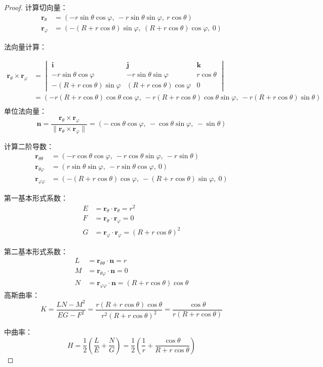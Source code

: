 \documentclass[lang=cn,10pt,thmcnt=section]{elegantbook}
\begin{document}
\begin{proof}
    计算切向量：
\begin{align*}
\bm{r}_\theta &= (-r \sin\theta \cos\varphi,\ -r \sin\theta \sin\varphi,\ r \cos\theta) \\
\bm{r}_\varphi &= (-(R + r \cos\theta) \sin\varphi,\ (R + r \cos\theta) \cos\varphi,\ 0)
\end{align*}

法向量计算：

\begin{align*}
    \bm{r}_\theta \times \bm{r}_\varphi &= \begin{vmatrix}
        \bm{i} & \bm{j} & \bm{k} \\
        -r \sin\theta \cos\varphi & -r \sin\theta \sin\varphi & r \cos\theta \\
        -(R + r \cos\theta)\sin\varphi & (R + r \cos\theta)\cos\varphi & 0
        \end{vmatrix}\\
        &= (-r(R + r \cos\theta)\cos\theta\cos\varphi,\ -r(R + r \cos\theta)\cos\theta\sin\varphi,\ -r(R + r \cos\theta)\sin\theta) \\
\end{align*}
单位法向量：
\[
\bm{n} = \frac{\bm{r}_\theta \times \bm{r}_\varphi}{\|\bm{r}_\theta \times \bm{r}_\varphi\|} = (-\cos\theta\cos\varphi,\ -\cos\theta\sin\varphi,\ -\sin\theta)
\]

计算二阶导数：
\begin{align*}
\bm{r}_{\theta\theta} &= (-r \cos\theta \cos\varphi,\ -r \cos\theta \sin\varphi,\ -r \sin\theta) \\
\bm{r}_{\theta\varphi} &= (r \sin\theta \sin\varphi,\ -r \sin\theta \cos\varphi,\ 0) \\
\bm{r}_{\varphi\varphi} &= (-(R + r \cos\theta) \cos\varphi,\ -(R + r \cos\theta) \sin\varphi,\ 0)
\end{align*}


第一基本形式系数：
\begin{align*}
E &= \bm{r}_\theta \cdot \bm{r}_\theta = r^2 \\
F &= \bm{r}_\theta \cdot \bm{r}_\varphi = 0 \\
G &= \bm{r}_\varphi \cdot \bm{r}_\varphi = (R + r \cos\theta)^2
\end{align*}

第二基本形式系数：
\begin{align*}
L &= \bm{r}_{\theta\theta} \cdot \bm{n} = r \\ 
M &= \bm{r}_{\theta\varphi} \cdot \bm{n} = 0 \\
N &= \bm{r}_{\varphi\varphi} \cdot \bm{n} = (R + r \cos\theta)\cos\theta
\end{align*}
高斯曲率：
\[
K = \frac{LN - M^2}{EG - F^2} = \frac{r(R + r \cos\theta)\cos\theta}{r^2(R + r \cos\theta)^2} = \frac{\cos\theta}{r(R + r \cos\theta)}
\]

中曲率：
\[
H = \frac{1}{2}\left(\frac{L}{E} + \frac{N}{G}\right) = \frac{1}{2}\left(\frac{1}{r} + \frac{\cos\theta}{R + r \cos\theta}\right)
\]
\end{proof}
\end{document}
